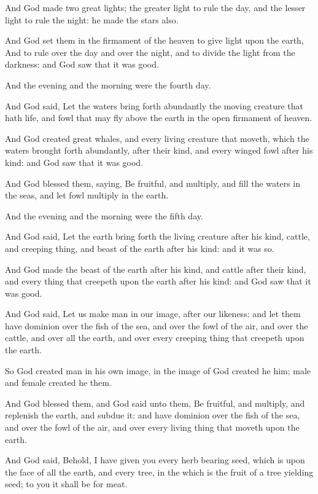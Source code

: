\verse And God made two great lights; the greater light to rule the day,
and the lesser light to rule the night: he made the stars also.

\verse And God set them in the firmament of the heaven to give light
upon the earth, \verse And to rule over the day and over the night, and
to divide the light from the darkness: and God saw that it was good.

\verse And the evening and the morning were the fourth day.

\verse And God said, Let the waters bring forth abundantly the moving
creature that hath life, and fowl that may fly above the earth in the
open firmament of heaven.

\verse And God created great whales, and every living creature that
moveth, which the waters brought forth abundantly, after their kind,
and every winged fowl after his kind: and God saw that it was good.

\verse And God blessed them, saying, Be fruitful, and multiply, and fill
the waters in the seas, and let fowl multiply in the earth.

\verse And the evening and the morning were the fifth day.

\verse And God said, Let the earth bring forth the living creature after
his kind, cattle, and creeping thing, and beast of the earth after his
kind: and it was so.

\verse And God made the beast of the earth after his kind, and cattle
after their kind, and every thing that creepeth upon the earth after
his kind: and God saw that it was good.

\verse And God said, Let us make man in our image, after our likeness:
and let them have dominion over the fish of the sea, and over the fowl
of the air, and over the cattle, and over all the earth, and over
every creeping thing that creepeth upon the earth.

\verse So God created man in his own image, in the image of God created
he him; male and female created he them.

\verse And God blessed them, and God said unto them, Be fruitful, and
multiply, and replenish the earth, and subdue it: and have dominion
over the fish of the sea, and over the fowl of the air, and over every
living thing that moveth upon the earth.

\verse And God said, Behold, I have given you every herb bearing seed,
which is upon the face of all the earth, and every tree, in the which
is the fruit of a tree yielding seed; to you it shall be for meat.

